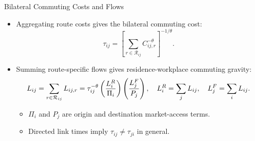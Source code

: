 \documentclass[11pt,aspectratio=169]{beamer}
\newcommand{\R}{\mathcal{R}}
\begin{document}
\begin{frame}[label=bilateral]{Bilateral Commuting Costs and Flows}
\begin{itemize}\small
  \item Aggregating route costs gives the bilateral commuting cost:
  \vspace{-0.5em}\begin{equation}\label{eq:bilateral}
    \tau_{ij} = \left[\sum_{r\in\R_{ij}} C_{ij,r}^{-\theta}\right]^{-1/\theta}.
  \end{equation}
  \vspace{-0.5em}
  \item Summing route-specific flows gives residence-workplace commuting gravity:
  \vspace{-0.35em}\begin{equation}\label{eq:gravity}
    L_{ij}=\sum_{r\in\R_{ij}}L_{ij,r}
    =\tau_{ij}^{-\theta}\left(\frac{L_i^R}{\Pi_i}\right)\left(\frac{L_j^F}{P_j}\right),
    \quad L_i^R=\sum_jL_{ij},\quad L_j^F=\sum_iL_{ij}.
  \vspace{-0.8em}\end{equation}
  \begin{itemize}\footnotesize
    \item $\Pi_i$ and $P_j$ are origin and destination market-access terms.
    \item Directed link times imply $\tau_{ij}\neq\tau_{ji}$ in general.
  \end{itemize}
\end{itemize}
\end{frame}
\end{document}
